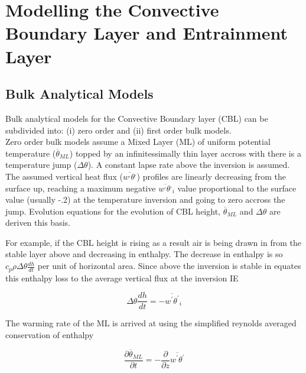 \section{Modelling the Convective Boundary Layer and Entrainment Layer}
\label{sec:}

\subsection{Bulk Analytical Models}
\label{subsec:}
Bulk analytical models for the Convective Boundary layer (\acs{CBL}) can be subdivided into: (i) zero order
and (ii) first order bulk models.\\

Zero order bulk models assume a Mixed Layer (\acs{ML}) of uniform potential temperature ($\overline{\theta}_{ML}$) topped by an infinitessimally 
thin layer accross with there is a temperature jump ($\Delta \theta$). A constant lapse rate above the inversion is assumed.  
The assumed vertical heat flux ($\overline{w^{,}\theta^{,}}$) profiles are linearly decreasing from the surface up, reaching 
a maximum negative $\overline{w^{,}\theta^{,}}_{i}$ value proportional to the surface value (usually -.2)
at the temperature inversion and going to zero accross the jump.  Evolution equations for the evolution of \acs{CBL} height,
 $\overline{\theta}_{ML}$ and $\Delta \theta$ are deriven this basis.

For example, if the \acs{CBL} height is rising as a result air is being drawn in from the stable layer above and decreasing in enthalpy.
The decrease in enthalpy is so $c_{p}\rho\Delta \theta \frac{dh}{dt}$ per unit of horizontal area.  Since above the 
inversion is stable \citeauthor{Tennekes73} in \cite{Tenekes73} equates this enthalpy loss to the average vertical flux at the inversion 
IE

\begin{equation}
\Delta \theta \frac{dh}{dt} = -\overline{w^{'}\theta^{'}}_{i} 
\end{equation}  

The warming rate of the \acs{ML} is arrived at using the simplified reynolds averaged conservation of enthalpy

\begin{equation}
\frac{\partial \overline{\theta}_{ML}}{\partial t} = -\frac{\partial}{\partial z}\overline{w^{'}\theta^{'}}
\end{equation}

